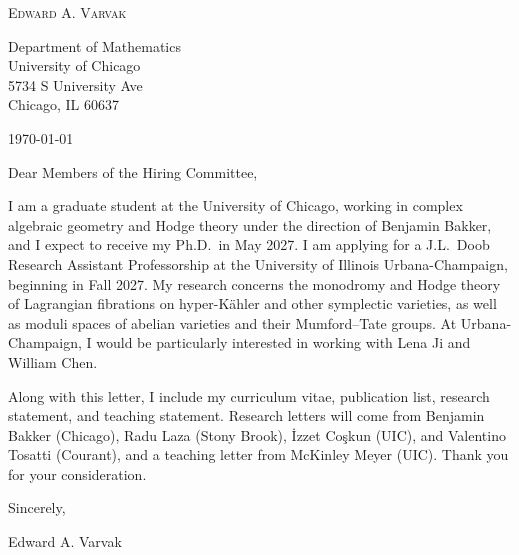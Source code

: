 \documentclass[12pt]{article}
\begin{document}
\begin{center}
  {\Large\textsc{Edward A. Varvak}}\\[10pt]
\end{center}

Department of Mathematics \\
University of Chicago \\
5734 S University Ave \\
Chicago, IL 60637

\today

Dear Members of the Hiring Committee,

I am a graduate student at the University of Chicago, working in complex
algebraic geometry and Hodge theory under the direction of Benjamin Bakker,
and I expect to receive my Ph.D.\ in May 2027. I am applying for a J.L.\ Doob
Research Assistant Professorship at the University of Illinois
Urbana-Champaign, beginning in Fall 2027. My research concerns the monodromy
and Hodge theory of Lagrangian fibrations on hyper-K\"ahler and other
symplectic varieties, as well as moduli spaces of abelian varieties and their
Mumford--Tate groups. At Urbana-Champaign, I would be particularly interested in
working with Lena Ji and William Chen.

Along with this letter, I include my curriculum vitae, publication list,
research statement, and teaching statement. Research letters will come from
Benjamin Bakker (Chicago), Radu Laza (Stony Brook), \.{I}zzet Co\c{s}kun
(UIC), and Valentino Tosatti (Courant), and a teaching letter from McKinley
Meyer (UIC). Thank you for your consideration.

Sincerely,

Edward A. Varvak
\end{document}
